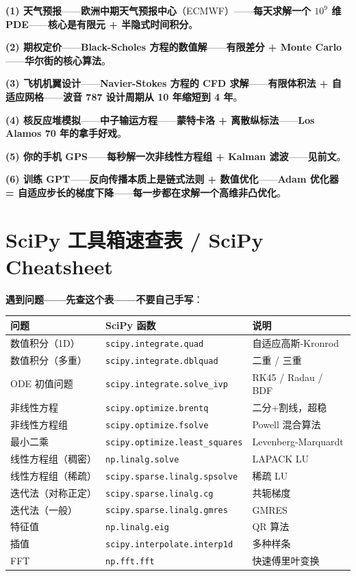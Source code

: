 \textbf{(1) 天气预报}——\textbf{欧洲中期天气预报中心}（ECMWF）——\textbf{每天求解一个 $10^9$ 维 PDE}——\textbf{核心是有限元 + 半隐式时间积分}。

\textbf{(2) 期权定价}——\textbf{Black-Scholes 方程的数值解}——\textbf{有限差分 + Monte Carlo}——\textbf{华尔街的核心算法}。

\textbf{(3) 飞机机翼设计}——\textbf{Navier-Stokes 方程的 CFD 求解}——\textbf{有限体积法 + 自适应网格}——\textbf{波音 787 设计周期从 10 年缩短到 4 年}。

\textbf{(4) 核反应堆模拟}——\textbf{中子输运方程}——\textbf{蒙特卡洛 + 离散纵标法}——\textbf{Los Alamos 70 年的拿手好戏}。

\textbf{(5) 你的手机 GPS}——\textbf{每秒解一次非线性方程组 + Kalman 滤波}——\textbf{见前文}。

\textbf{(6) 训练 GPT}——\textbf{反向传播本质上是链式法则 + 数值优化}——\textbf{Adam 优化器 = 自适应步长的梯度下降}——\textbf{每一步都在求解一个高维非凸优化}。

\section{SciPy 工具箱速查表 / SciPy Cheatsheet}

\textbf{遇到问题——先查这个表——不要自己手写}：

\begin{center}
\begin{tabular}{lll}
\toprule
\textbf{问题} & \textbf{SciPy 函数} & \textbf{说明} \\
\midrule
数值积分（1D） & \texttt{scipy.integrate.quad} & 自适应高斯-Kronrod \\
数值积分（多重） & \texttt{scipy.integrate.dblquad} & 二重 / 三重 \\
ODE 初值问题 & \texttt{scipy.integrate.solve\_ivp} & RK45 / Radau / BDF \\
非线性方程 & \texttt{scipy.optimize.brentq} & 二分+割线，超稳 \\
非线性方程组 & \texttt{scipy.optimize.fsolve} & Powell 混合算法 \\
最小二乘 & \texttt{scipy.optimize.least\_squares} & Levenberg-Marquardt \\
线性方程组（稠密） & \texttt{np.linalg.solve} & LAPACK LU \\
线性方程组（稀疏） & \texttt{scipy.sparse.linalg.spsolve} & 稀疏 LU \\
迭代法（对称正定） & \texttt{scipy.sparse.linalg.cg} & 共轭梯度 \\
迭代法（一般） & \texttt{scipy.sparse.linalg.gmres} & GMRES \\
特征值 & \texttt{np.linalg.eig} & QR 算法 \\
插值 & \texttt{scipy.interpolate.interp1d} & 多种样条 \\
FFT & \texttt{np.fft.fft} & 快速傅里叶变换 \\
\bottomrule
\end{tabular}
\end{center}

